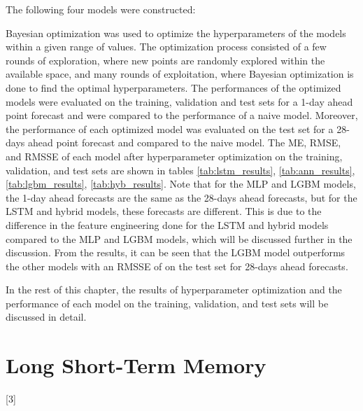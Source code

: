 The following four models were constructed: 
\begin{enumerate}
\end{enumerate}
Bayesian optimization was used to optimize the hyperparameters of the models within a given range of values.
The optimization process consisted of a few rounds of exploration, where new points are randomly explored within the available space, and many rounds of exploitation, where Bayesian optimization is done to find the optimal hyperparameters.
The performances of the optimized models were evaluated on the training, validation and test sets for a 1-day ahead point forecast and were compared to the performance of a naive model.
Moreover, the performance of each optimized model was evaluated on the test set for a 28-days ahead point forecast and compared to the naive model.
The ME, RMSE, and RMSSE of each model after hyperparameter optimization on the training, validation, and test sets are shown in tables \ref{tab:lstm_results}, \ref{tab:ann_results}, \ref{tab:lgbm_results}, \ref{tab:hyb_results}.
Note that for the MLP and LGBM models, the 1-day ahead forecasts are the same as the 28-days ahead forecasts, but for the LSTM and hybrid models, these forecasts are different.
This is due to the difference in the feature engineering done for the LSTM and hybrid models compared to the MLP and LGBM models, which will be discussed further in the discussion.
From the results, it can be seen that the LGBM model outperforms the other models with an RMSSE of \lgbmTstMonRMSSE{} on the test set for 28-days ahead forecasts.

In the rest of this chapter, the results of hyperparameter optimization and the performance of each model on the training, validation, and test sets will be discussed in detail. 

\section{Long Short-Term Memory}
[3]

